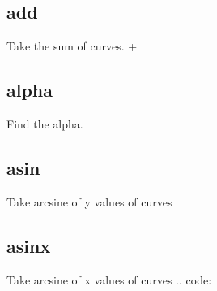 \documentclass[letterpaper,10pt,english]{sphinxmanual}
\begin{document}
\subsection{add}
\label{\detokenize{math_operations:add}}
Take the sum of curves.  +

\begin{sphinxVerbatim}[commandchars=\\\{\}]
\PYG{p}{[}\PYG{p}{]}  
\end{sphinxVerbatim}


\subsection{alpha}
\label{\detokenize{math_operations:alpha}}
Find the alpha.

\begin{sphinxVerbatim}[commandchars=\\\{\}]
\PYG{p}{[}\PYG{p}{]}     \PYG{p}{[}\PYG{c+c1}{\PYGZsh{} points]}
\end{sphinxVerbatim}


\subsection{asin}
\label{\detokenize{math_operations:asin}}
Take arcsine of y values of curves

\begin{sphinxVerbatim}[commandchars=\\\{\}]
\PYG{p}{[}\PYG{p}{]}  
\end{sphinxVerbatim}


\subsection{asinx}
\label{\detokenize{math_operations:asinx}}
Take arcsine of x values of curves
.. code:

\begin{sphinxVerbatim}[commandchars=\\\{\}]
\PYG{p}{[}\PYG{p}{]}  
\end{sphinxVerbatim}
\end{document}
